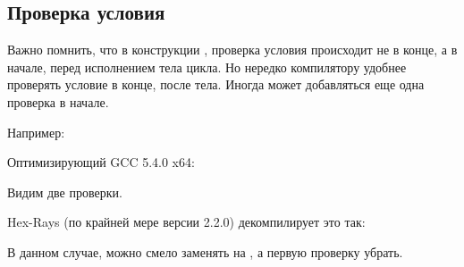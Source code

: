 \subsection{Проверка условия}

Важно помнить, что в конструкции , проверка условия происходит не в конце, а в начале, перед исполнением тела цикла.
Но нередко компилятору удобнее проверять условие в конце, после тела.
Иногда может добавляться еще одна проверка в начале.

Например:



Оптимизирующий GCC 5.4.0 x64:



Видим две проверки.

Hex-Rays (по крайней мере версии 2.2.0) декомпилирует это так:



В данном случае,  можно смело заменять на , а первую проверку убрать.


